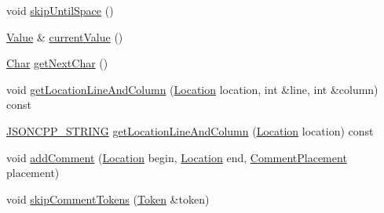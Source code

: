 \begin{DoxyCompactItemize}
\item 
void \hyperlink{class_json_1_1_reader_ad922ea5a8ab333084edbb84827861fa3}{skip\+Until\+Space} ()
\item 
\hyperlink{class_json_1_1_value}{Value} \& \hyperlink{class_json_1_1_reader_a85597f763fb0148a17359b6dfc6f7326}{current\+Value} ()
\item 
\hyperlink{class_json_1_1_reader_a3eec9118f3e9a672ba8348c3a79d0f45}{Char} \hyperlink{class_json_1_1_reader_ab61eb61333cc9ec3afe785663a53ce90}{get\+Next\+Char} ()
\item 
void \hyperlink{class_json_1_1_reader_a8b2fb6af24382c3914fd4643b092c675}{get\+Location\+Line\+And\+Column} (\hyperlink{class_json_1_1_reader_a46795b5b272bf79a7730e406cb96375a}{Location} location, int \&line, int \&column) const
\item 
\hyperlink{json_8h_a1e723f95759de062585bc4a8fd3fa4be}{J\+S\+O\+N\+C\+P\+P\+\_\+\+S\+T\+R\+I\+NG} \hyperlink{class_json_1_1_reader_a49757dec5a1a53eff388dc7bf2bda890}{get\+Location\+Line\+And\+Column} (\hyperlink{class_json_1_1_reader_a46795b5b272bf79a7730e406cb96375a}{Location} location) const
\item 
void \hyperlink{class_json_1_1_reader_aaea3bd62d12ffb6117a61476c0685049}{add\+Comment} (\hyperlink{class_json_1_1_reader_a46795b5b272bf79a7730e406cb96375a}{Location} begin, \hyperlink{class_json_1_1_reader_a46795b5b272bf79a7730e406cb96375a}{Location} end, \hyperlink{namespace_json_a4fc417c23905b2ae9e2c47d197a45351}{Comment\+Placement} placement)
\item 
void \hyperlink{class_json_1_1_reader_a22e677ef400d8223f27e631b4cd4b821}{skip\+Comment\+Tokens} (\hyperlink{class_json_1_1_reader_1_1_token}{Token} \&token)
\end{DoxyCompactItemize}
